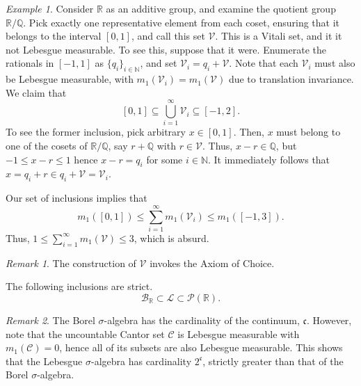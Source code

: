 \documentclass[11pt]{article}
\newcommand{\R}{\mathbb{R}}
\newcommand{\Q}{\mathbb{Q}}
\newcommand{\N}{\mathbb{N}}
\renewcommand{\L}{\mathcal{L}}
\theoremstyle{definition}
\theoremstyle{remark}
\newtheorem*{remark}{Remark}
\newtheorem*{example}{Example}
\numberwithin{equation}{section}
\begin{document}
    \begin{example}
        Consider $\R$ as an additive group, and examine the quotient group $\R/\Q$.
        Pick exactly one representative element from each coset, ensuring that it
        belongs to the interval $[0, 1]$, and call this set $\mathcal{V}$. This is a
        Vitali set, and it it not Lebesgue measurable. To see this, suppose that it
        were. Enumerate the rationals in $[-1, 1]$ as $\{q_i\}_{i \in \N}$, and set
        $\mathcal{V}_i = q_i + \mathcal{V}$. Note that each $\mathcal{V}_i$ must also
        be Lebesgue measurable, with $m_1(\mathcal{V}_i) = m_1(\mathcal{V})$ due to
        translation invariance. We claim that \[
            [0, 1] \subseteq \bigcup_{i = 1}^\infty
            \mathcal{V}_i \subseteq [-1, 2].
        \] To see the former inclusion, pick arbitrary $x \in [0, 1]$. Then, $x$ must
        belong to one of the cosets of $\R/\Q$, say $r + \Q$ with $r \in
        \mathcal{V}$.  Thus, $x - r \in \Q$, but $-1 \leq x - r \leq 1$ hence $x - r
        = q_i$ for some $i \in \N$. It immediately follows that $x = q_i + r \in q_i
        + \mathcal{V} = \mathcal{V}_i$.

        Our set of inclusions implies that \[
            m_1([0, 1]) \leq \sum_{i = 1}^\infty m_1(\mathcal{V}_i) \leq m_1([-1, 3]).
        \] Thus, $1 \leq \sum_{i = 1}^\infty m_1(\mathcal{V}) \leq 3$, which is
        absurd.

        \begin{remark}
            The construction of $\mathcal{V}$ invokes the Axiom of Choice.
        \end{remark}
    \end{example}

    \begin{lemma}
        The following inclusions are strict. \[
            \mathcal{B}_\R \subset \L \subset \mathcal{P}(\R).
        \] 
        \begin{remark}
            The Borel $\sigma$-algebra has the cardinality of the continuum,
            $\mathfrak{c}$. However, note that the uncountable Cantor set
            $\mathcal{C}$ is Lebesgue measurable with $m_1(\mathcal{C}) = 0$, hence
            all of its subsets are also Lebesgue measurable. This shows that the
            Lebesgue $\sigma$-algebra has cardinality $2^\mathfrak{c}$, strictly
            greater than that of the Borel $\sigma$-algebra.
        \end{remark}
    \end{lemma}
    
\end{document}

